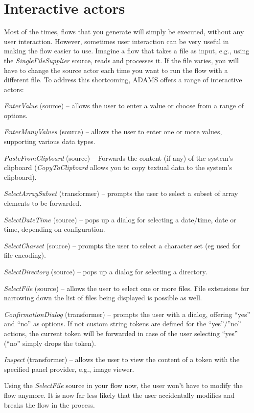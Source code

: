 \clearpage
\section{Interactive actors}
\label{interactive_actors}
Most of the times, flows that you generate will simply be executed, without any
user interaction. However, sometimes user interaction can be very useful in
making the flow easier to use. Imagine a flow that takes a file as input, e.g.,
using the \textit{SingleFileSupplier} source, reads and processes it. If the
file varies, you will have to change the source actor each time you want to run
the flow with a different file. To address this shortcoming, ADAMS offers a
range of interactive actors:
\begin{tight_itemize}
	\item \textit{EnterValue} (source) -- allows the user to enter a value or
	choose from a range of options.
	\item \textit{EnterManyValues} (source) -- allows the user to enter one
	or more values, supporting various data types.
	\item \textit{PasteFromClipboard} (source) -- Forwards the content (if any) of
	the system's clipboard (\textit{CopyToClipboard} allows you to copy textual
	data to the system's clipboard).
	\item \textit{SelectArraySubset} (transformer) -- prompts the user to select
	a subset of array elements to be forwarded.
	\item \textit{SelectDateTime} (source) -- pops up a dialog for selecting a
	date/time, date or time, depending on configuration.
	\item \textit{SelectCharset} (source) -- prompts the user to select a
	character set (eg used for file encoding).
	\item \textit{SelectDirectory} (source) -- pops up a dialog for selecting a
	directory.
	\item \textit{SelectFile} (source) -- allows the user to select one or more
	files. File extensions for narrowing down the list of files being displayed is
	possible as well.
	\item \textit{ConfirmationDialog} (transformer) -- prompts the user with a
	dialog, offering ``yes'' and ``no'' as options. If not custom string tokens are
	defined for the ``yes''/''no'' actions, the current token will be forwarded in
	case of the user selecting ``yes'' (``no'' simply drops the token).
	\item \textit{Inspect} (transformer) -- allows the user to view the content
	of a token with the specified panel provider, e.g., image viewer.
\end{tight_itemize}
Using the \textit{SelectFile} source in your flow now, the user won't have to
modify the flow anymore. It is now far less likely that the user accidentally
modifies and breaks the flow in the process.

